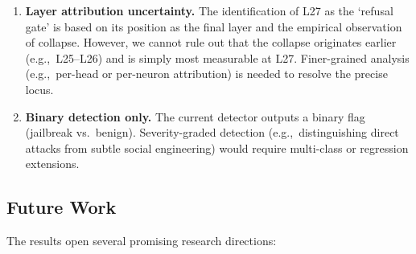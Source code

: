 \documentclass[12pt,a4paper]{article}
\begin{document}
\begin{enumerate}[leftmargin=*]
    \item \textbf{Layer attribution uncertainty.} The identification of L27 as the `refusal gate' is based on its position as the final layer and the empirical observation of collapse. However, we cannot rule out that the collapse originates earlier (e.g.,~L25--L26) and is simply most measurable at L27. Finer-grained analysis (e.g.,~per-head or per-neuron attribution) is needed to resolve the precise locus.
    \item \textbf{Binary detection only.} The current detector outputs a binary flag (jailbreak vs.~benign). Severity-graded detection (e.g.,~distinguishing direct attacks from subtle social engineering) would require multi-class or regression extensions.
\end{enumerate}

\subsection{Future Work}

The results open several promising research directions:
\end{document}
